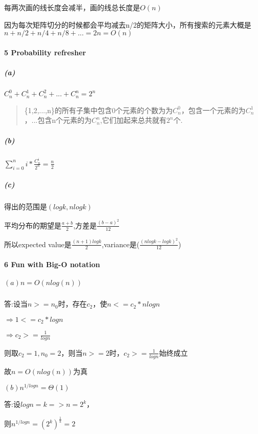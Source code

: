 \documentclass[
]{ctexart}
\begin{document}
每两次画的线长度会减半，画的线总长度是\(O(n)\)

因为每次矩阵切分的时候都会平均减去n/2的矩阵大小，所有搜索的元素大概是\(n+n/2+n/4+n/8+...=2n=O(n)\)

\hypertarget{header-n84}{%
\paragraph{5 Probability refresher}\label{header-n84}}

\hypertarget{header-n85}{%
\subparagraph{(a)}\label{header-n85}}

\(C_n^0+C_n^1+C_n^2+...+C_n^n = 2^n\)

\begin{quote}
\{1,2,...,n\}的所有子集中包含0个元素的个数为为\(C_n^0\)，包含一个元素的为\(C_n^1\)，...包含n个元素的为\(C_n^n\),它们加起来总共就有\(2^n\)个.
\end{quote}

\hypertarget{header-n89}{%
\subparagraph{(b)}\label{header-n89}}

\(\sum_{i=0}^{n}i*\frac{C_n^i}{2^n}=\frac{n}{2}\)

\hypertarget{header-n91}{%
\subparagraph{(c)}\label{header-n91}}

得出的范围是\((logk,nlogk)\)

平均分布的期望是\(\frac{a+b}{2}\),方差是\(\frac{(b-a)^2}{12}\)

所以expected
value是\(\frac{(n+1)logk}{2}\),variance是(\(\frac{(nlogk-logk)^2}{12}\))

\hypertarget{header-n96}{%
\paragraph{6 Fun with Big-O notation}\label{header-n96}}

\hypertarget{header-n97}{%
\subparagraph{\texorpdfstring{\((a)n=O(nlog(n))\)}{(a)n=O(nlog(n))}}\label{header-n97}}

答:设当\(n>=n_0\)时，存在\(c_2\)，使\(n<=c_2*nlogn\)

\(\Rightarrow 1<=c_2*logn\)

\(\Rightarrow c_2>=\frac{1}{logn}\)

则取\(c_2=1,n_0=2\)，则当\(n>=2\)时，\(c_2>=\frac{1}{logn}\)始终成立

故\(n=O(nlog(n))\)为真

\((b)n^{1/logn}=\Theta(1)\)

答:设\(logn=k=>n=2^k\)，

则\(n^{1/logn}=(2^{k})^{\frac{1}{k}}=2\)
\end{document}
